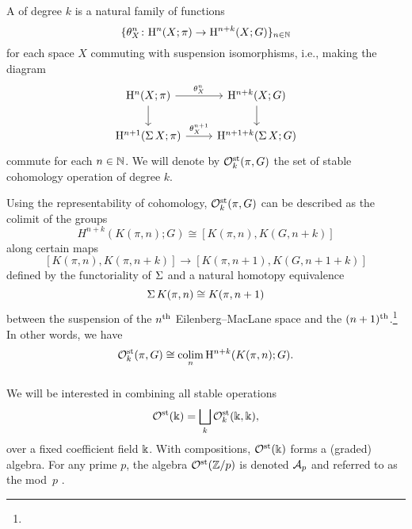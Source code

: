 \subsubsection{} A  of degree $k$ is a natural family of functions
\[
\{\theta^n_X \colon \mathrm{H}^n(X; \pi) \to \mathrm{H}^{n+k}(X; G)\}_{n \in \mathbb{N}}
\]
for each space $X$ commuting with suspension isomorphisms, i.e., making the diagram
\[
\begin{tikzcd}
	\rH^n(X; \pi) \rar["\theta^n_X"] \dar & \rH^{n+k}(X; G) \dar \\
	\rH^{n+1}(\sus X; \pi) \rar["\theta^{n+1}_X"] & \rH^{n+1+k}(\sus X; G)
\end{tikzcd}
\]
commute for each $n \in \mathbb{N}$.
We will denote by $\mathcal{O}^{\mathrm{st}}_k(\pi, G)$ the set of stable cohomology operation of degree $k$.


Using the representability of cohomology, $\mathcal{O}^{\mathrm{st}}_k(\pi, G)$ can be described as the colimit of the groups
\[
H^{n+k}(K(\pi, n); G) \cong [K(\pi, n), K(G, n+k)]
\]
along certain maps
\[
[K(\pi, n), K(\pi, n+k)] \to [K(\pi, n+1), K(G, n+1+k)]
\]
defined by the functoriality of $\operatorname{\Sigma}$ and a natural homotopy equivalence
\begin{equation}\label{eq:suspension of K(pi,n)}
	\operatorname{\Sigma} K(\pi, n) \cong K(\pi, n+1)
\end{equation}
between the suspension of the $n^{\mathrm{th}}$ Eilenberg--MacLane space and the $(n+1)^{\mathrm{th}}$.\footnote{}
In other words, we have
\[
\mathcal{O}^{\mathrm{st}}_k(\pi, G) \cong \operatorname*{colim}_n \mathrm{H}^{n+k}(K(\pi, n); G).
\]

\subsubsection{} We will be interested in combining all stable operations
\[
\mathcal{O}^{\mathrm{st}}(\Bbbk) = \bigsqcup_k \mathcal{O}^{\mathrm{st}}_k(\Bbbk, \Bbbk),
\]
over a fixed coefficient field $\Bbbk$.
With compositions, $\mathcal{O}^{\mathrm{st}}(\Bbbk)$ forms a (graded) algebra.
For any prime $p$, the algebra $\mathcal{O}^{\mathrm{st}}(\mathbb{Z}/p)$ is denoted $\mathcal{A}_p$ and referred to as the mod~$p$ .

